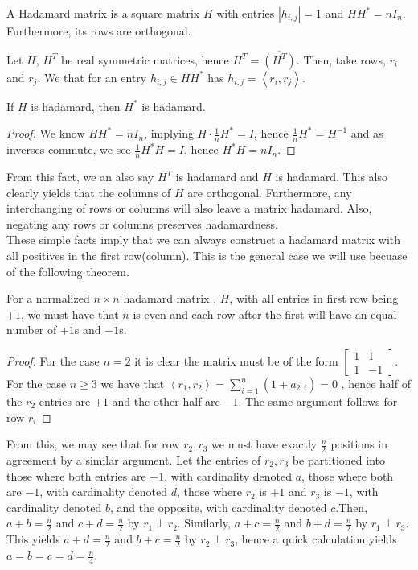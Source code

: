 \begin{recall}
	A Hadamard matrix is a square matrix \(H\) with entries \(\left|h_{i, j} \right| = 1\) and \(HH^{*} = nI_{n}\). Furthermore, its rows are orthogonal.
\end{recall}

Let \(H\), \(H^{T}\) be real symmetric matrices, hence \(H^{T} = \overline{ \left( H^{T} \right)} \). Then, take rows, \(r_{i}\) and \(r_{j}\). We that for an entry \(h_{i, j} \in H H^{*}\) has \(h_{i, j} = \left<r_{i}, r_{j} \right> \).\\
\begin{proposition}
	If \(H\) is hadamard, then \(H^{*}\) is hadamard.
\end{proposition}
\begin{proof}
	We know \(HH^{*} = nI_{n}\), implying \(H \cdot \frac{1}{n}H^{*} = I\), hence \(\frac{1}{n}H^{*} = H^{-1}\) and as inverses commute, we see \(\frac{1}{n}H^{*}H = I\), hence \(H^{*}H= nI_{n}\).
\end{proof}
From this fact, we an also say \(H^{T}\) is hadamard and \(\overline{H}\) is hadamard. This also clearly yields that the columns of \(H\) are orthogonal. Furthermore, any interchanging of rows or columns will also leave a matrix hadamard. Also, negating any rows or columns preserves hadamardness.\\
These simple facts imply that we can always construct a hadamard matrix with all positives in the first row(column). This is the general case we will use becuase of the following theorem.
\begin{proposition}
	For a normalized \(n \times n\) hadamard matrix , \(H\), with all entries in first row being \(+1\), we must have that \(n\) is even and each row after the first will have an equal number of \(+1\)s and \(-1\)s.
\end{proposition}
\begin{proof}
	For the case \(n = 2\) it is clear the matrix must be of the form \(\begin{bmatrix} 1&1\\1&-1 \end{bmatrix} \). For the case \(n\ge 3\) we have that \(\left<r_1, r_2 \right> = \sum_{i= 1}^{n} (1 + a_{2, i}) = 0\)  , hence half  of the \(r_2\) entries are \(+1\) and the other half are \(-1\). The same argument follows for row \(r_{i}\)
\end{proof}
From this, we may see that for row \(r_2, r_3\) we must have exactly \(\frac{n}{2}\) positions in agreement by a similar argument. Let the entries of \(r_2, r_3\) be partitioned into those where both entries are \(+1\), with cardinality denoted \(a\), those where both are \(-1\), with cardinality denoted \(d\), those where \(r_2\) is \(+1\) and \(r_3\) is \(-1\), with cardinality denoted \(b\), and the opposite, with cardinality denoted \(c\).Then, \(a + b = \frac{n}{2}\) and  \(c+d = \frac{n}{2}\) by \(r_1 \perp r_2\). Similarly,  \(a+c = \frac{n}{2}\) and \(b+d = \frac{n}{2}\) by \(r_1 \perp r_3\). This yields \(a + d = \frac{n}{2}\) and \(b+c = \frac{n}{2}\) by \(r_2 \perp r_3\), hence a quick calculation yields \(a=b=c=d=\frac{n}{4}\).\\

